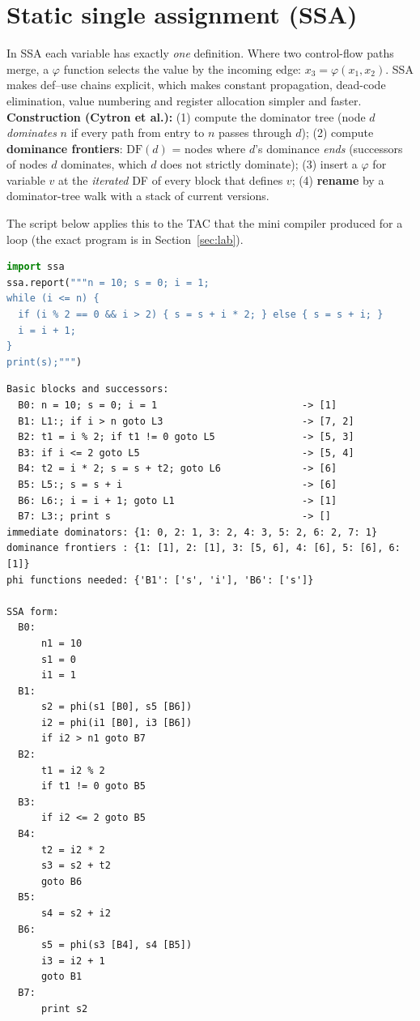 \documentclass[10pt,a4paper,openany,oneside]{report}
\newcommand{\prio}[1]{\texorpdfstring{\ifcase#1\or{\color{gold}\ding{72}}\or{\color{gold}\ding{72}\ding{72}}\or{\color{gold}\ding{72}\ding{72}\ding{72}}\fi}{}}
\begin{document}
\section{Static single assignment (SSA) \prio{3}}
\begin{mustbox}
In SSA each variable has exactly \emph{one} definition. Where two control-flow paths merge, a $\varphi$ function selects the value by the incoming edge: $x_3=\varphi(x_1,x_2)$. SSA makes def--use chains explicit, which makes constant propagation, dead-code elimination, value numbering and register allocation simpler and faster.
\textbf{Construction (Cytron et al.):} (1) compute the dominator tree (node $d$ \emph{dominates} $n$ if every path from entry to $n$ passes through $d$); (2) compute \textbf{dominance frontiers}: $\mathrm{DF}(d)$ = nodes where $d$'s dominance \emph{ends} (successors of nodes $d$ dominates, which $d$ does not strictly dominate); (3) insert a $\varphi$ for variable $v$ at the \emph{iterated} DF of every block that defines $v$; (4) \textbf{rename} by a dominator-tree walk with a stack of current versions.
\end{mustbox}
The script below applies this to the TAC that the mini compiler produced for a loop (the exact program is in Section~\ref{sec:lab}).
\begin{lstlisting}[language={Python},title={Dominators, dominance frontiers, phi placement and SSA renaming}]
import ssa
ssa.report("""n = 10; s = 0; i = 1;
while (i <= n) {
  if (i % 2 == 0 && i > 2) { s = s + i * 2; } else { s = s + i; }
  i = i + 1;
}
print(s);""")
\end{lstlisting}
\begin{lstlisting}[style=out,title={Captured output}]
Basic blocks and successors:
  B0: n = 10; s = 0; i = 1                         -> [1]
  B1: L1:; if i > n goto L3                        -> [7, 2]
  B2: t1 = i % 2; if t1 != 0 goto L5               -> [5, 3]
  B3: if i <= 2 goto L5                            -> [5, 4]
  B4: t2 = i * 2; s = s + t2; goto L6              -> [6]
  B5: L5:; s = s + i                               -> [6]
  B6: L6:; i = i + 1; goto L1                      -> [1]
  B7: L3:; print s                                 -> []
immediate dominators: {1: 0, 2: 1, 3: 2, 4: 3, 5: 2, 6: 2, 7: 1}
dominance frontiers : {1: [1], 2: [1], 3: [5, 6], 4: [6], 5: [6], 6: [1]}
phi functions needed: {'B1': ['s', 'i'], 'B6': ['s']}

SSA form:
  B0:
      n1 = 10
      s1 = 0
      i1 = 1
  B1:
      s2 = phi(s1 [B0], s5 [B6])
      i2 = phi(i1 [B0], i3 [B6])
      if i2 > n1 goto B7
  B2:
      t1 = i2 % 2
      if t1 != 0 goto B5
  B3:
      if i2 <= 2 goto B5
  B4:
      t2 = i2 * 2
      s3 = s2 + t2
      goto B6
  B5:
      s4 = s2 + i2
  B6:
      s5 = phi(s3 [B4], s4 [B5])
      i3 = i2 + 1
      goto B1
  B7:
      print s2
\end{lstlisting}
\end{document}
